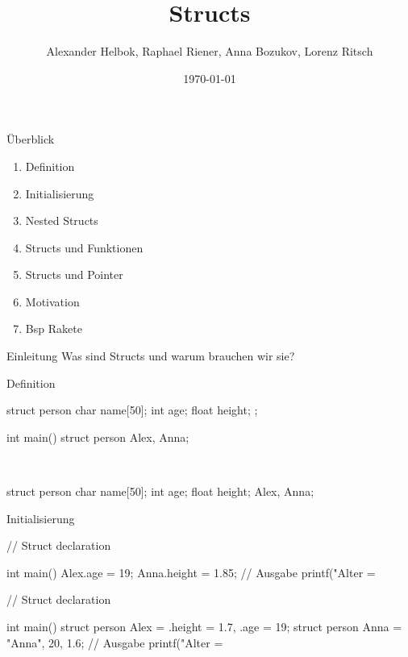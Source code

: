 \documentclass[10pt]{beamer}
\title{Structs}
\author{Alexander Helbok, Raphael Riener, Anna Bozukov, Lorenz Ritsch}
\date{\today}
\begin{document}
	
	\maketitle
	\begin{frame}[fragile]{Überblick}
		\begin{enumerate}
			\item Definition
			\item Initialisierung
			\item Nested Structs
			\item Structs und Funktionen
			\item Structs und Pointer
			\item Motivation
			\item Bsp Rakete
		\end{enumerate}
	\end{frame}
	
	\begin{frame}[fragile]{Einleitung}
		\Large Was sind Structs und warum brauchen wir sie?
	\end{frame}

	\begin{frame}[fragile]{Definition}
		\begin{myr}
			struct person{
				char name[50];
				int age;
				float height;
			}; 
		
			int main(){
				struct person Alex, Anna;
			}\end{myr}\\
		\begin{myr}
			struct person{
				char name[50];
				int age;
				float height;
			} Alex, Anna; \end{myr}
	\end{frame}

	\begin{frame}[fragile]{Initialisierung}
		\begin{myr}
			// Struct declaration
			
			int main(){
				Alex.age = 19;
				Anna.height = 1.85;
				// Ausgabe
				printf("Alter = %
			} \end{myr}
		\begin{myr}
			// Struct declaration
			
			int main(){
				struct person Alex = {.height = 1.7, .age = 19};
				struct person Anna = {"Anna", 20, 1.6};
				// Ausgabe
				printf("Alter = %
			} \end{myr}
	\end{frame}
\end{document}
